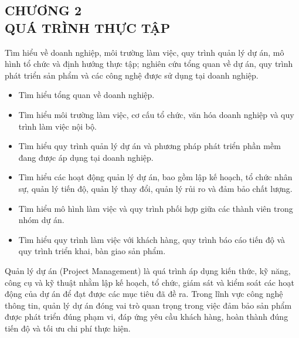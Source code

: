 \begin{center}
	\section*{CHƯƠNG 2\\
	\textbf{QUÁ TRÌNH THỰC TẬP}}
\end{center}

Tìm hiểu về doanh nghiệp, môi trường làm việc, quy trình quản lý dự án, mô hình tổ chức và định hướng thực tập; nghiên cứu tổng quan về dự án, quy trình phát triển sản phẩm và các công nghệ được sử dụng tại doanh nghiệp.


\begin{itemize}

    \item Tìm hiểu tổng quan về doanh nghiệp.

    \item Tìm hiểu môi trường làm việc, cơ cấu tổ chức, văn hóa doanh nghiệp và quy trình làm việc nội bộ.

    \item Tìm hiểu quy trình quản lý dự án và phương pháp phát triển phần mềm đang được áp dụng tại doanh nghiệp.

    \item Tìm hiểu các hoạt động quản lý dự án, bao gồm lập kế hoạch, tổ chức nhân sự, quản lý tiến độ, quản lý thay đổi, quản lý rủi ro và đảm bảo chất lượng.

    \item Tìm hiểu mô hình làm việc và quy trình phối hợp giữa các thành viên trong nhóm dự án.

    \item Tìm hiểu quy trình làm việc với khách hàng, quy trình báo cáo tiến độ và quy trình triển khai, bàn giao sản phẩm.

\end{itemize}



\hspace{0.2cm}Quản lý dự án (Project Management) là quá trình áp dụng kiến thức, kỹ năng, công cụ và kỹ thuật nhằm lập kế hoạch, tổ chức, giám sát và kiểm soát các hoạt động của dự án để đạt được các mục tiêu đã đề ra. Trong lĩnh vực công nghệ thông tin, quản lý dự án đóng vai trò quan trọng trong việc đảm bảo sản phẩm được phát triển đúng phạm vi, đáp ứng yêu cầu khách hàng, hoàn thành đúng tiến độ và tối ưu chi phí thực hiện.

